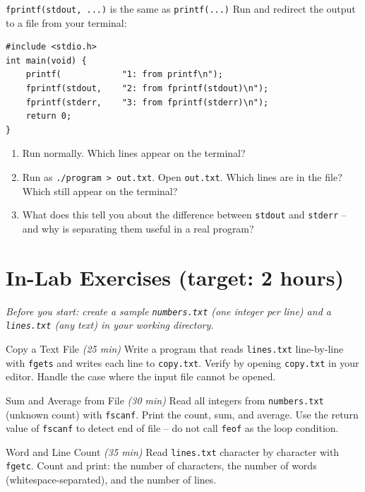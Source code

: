 \documentclass[11pt]{article}
\begin{document}
\begin{tryit}{\texttt{fprintf(stdout, ...)} is the same as \texttt{printf(...)}}
Run and redirect the output to a file from your terminal:
\begin{lstlisting}
#include <stdio.h>
int main(void) {
    printf(            "1: from printf\n");
    fprintf(stdout,    "2: from fprintf(stdout)\n");
    fprintf(stderr,    "3: from fprintf(stderr)\n");
    return 0;
}
\end{lstlisting}
\begin{enumerate}[nosep,leftmargin=*]
  \item Run normally. Which lines appear on the terminal?
  \item Run as \texttt{./program > out.txt}. Open \texttt{out.txt}. Which lines are in
        the file? Which still appear on the terminal?
  \item What does this tell you about the difference between \texttt{stdout} and
        \texttt{stderr} -- and why is separating them useful in a real program?
\end{enumerate}
\end{tryit}

\section*{In-Lab Exercises (target: 2 hours)}

\noindent\textit{Before you start: create a sample \texttt{numbers.txt} (one integer per line)
and a \texttt{lines.txt} (any text) in your working directory.}

\begin{labexercise}{Copy a Text File \hfill {\small \itshape (25 min)}}
Write a program that reads \texttt{lines.txt} line-by-line with \texttt{fgets} and writes
each line to \texttt{copy.txt}. Verify by opening \texttt{copy.txt} in your editor.
Handle the case where the input file cannot be opened.
\end{labexercise}

\begin{labexercise}{Sum and Average from File \hfill {\small \itshape (30 min)}}
Read all integers from \texttt{numbers.txt} (unknown count) with \texttt{fscanf}.
Print the count, sum, and average. Use the return value of \texttt{fscanf}
to detect end of file -- do not call \texttt{feof} as the loop condition.
\end{labexercise}

\begin{labexercise}{Word and Line Count \hfill {\small \itshape (35 min)}}
Read \texttt{lines.txt} character by character with \texttt{fgetc}. Count and print:
the number of characters, the number of words (whitespace-separated), and the
number of lines.
\end{labexercise}
\end{document}

